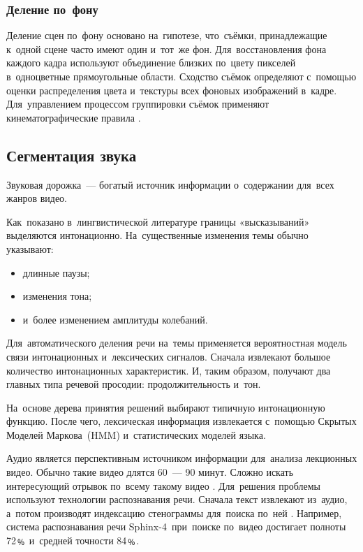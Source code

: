 \subsubsection{Деление по~фону}

Деление сцен по~фону основано на~гипотезе, что~съёмки,
принадлежащие к~одной сцене часто имеют один и~тот~же фон.
Для~восстановления фона каждого кадра используют объединение
близких по~цвету пикселей в~одноцветные прямоугольные области.
Сходство съёмок определяют с~помощью оценки распределения
цвета и~текстуры всех фоновых изображений в~кадре.
Для~управлением процессом группировки съёмок
применяют кинематографические правила \cite{Chen:2008}.




\subsection{Сегментация звука}

Звуковая дорожка~— богатый источник информации
о~содержании для~всех жанров видео.

Как~показано в~лингвистической литературе границы «высказываний»
выделяются интонационно.
На~существенные изменения темы обычно указывают:
\begin{itemize}
    \item длинные паузы;
    \item изменения тона;
    \item и~более изменением амплитуды колебаний.
\end{itemize}

Для~автоматического деления речи на~темы
применяется вероятностная модель связи интонационных
и~лексических сигналов.
Сначала извлекают большое количество интонационных характеристик.
И, таким образом, получают два главных типа речевой просодии:
продолжительность и~тон.

На~основе дерева принятия решений выбирают
типичную интонационную функцию.
После чего, лексическая информация извлекается
с~помощью Скрытых Моделей
Маркова\ (HMM)
и~статистических моделей языка.

Аудио является перспективным источником информации
для~анализа лекционных видео.
Обычно такие видео длятся 60~— 90 минут.
Сложно искать интересующий отрывок по~всему такому видео \cite{Repp:2008}.
Для~решения проблемы используют технологии
распознавания речи.
Сначала текст извлекают из~аудио,
а~потом производят индексацию стенограммы для~поиска по~ней \cite{Kumar:2011}.
Например, система распознавания речи Sphinx-4\ при~поиске
по~видео достигает полноты 72﹪ и~средней точности 84﹪.

